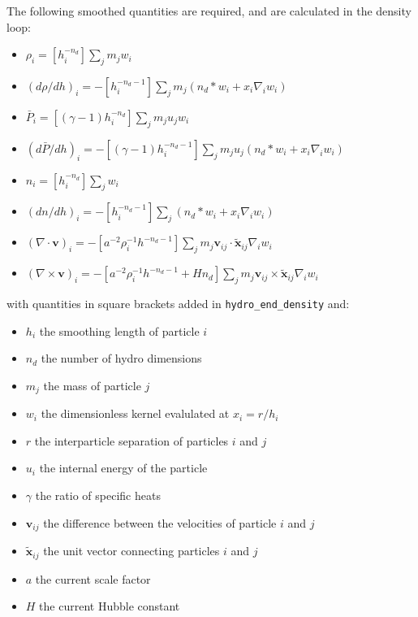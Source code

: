 The following smoothed quantities are required, and are calculated in the density loop:
\begin{itemize}
	\item $\rho_i = [h_i^{-n_d}]\sum_j m_j w_{i}$
	\item $(d\rho/dh)_i = - [h_i^{-n_d - 1}]\sum_j m_j ( n_d * w_i + x_i \nabla_i w_i)$
	\item $\bar{P}_i = [(\gamma - 1)h_i^{-n_d}]\sum_j m_j u_j w_{i}$
	\item $(d\bar{P}/dh)_i = - [(\gamma - 1)h_i^{-n_d - 1}]\sum_j m_j u_j ( n_d * w_i + x_i \nabla_i w_i)$
	\item $n_i = [h_i^{-n_d}]\sum_j w_{i}$
	\item $(dn/dh)_i = - [h_i^{-n_d - 1}]\sum_j ( n_d * w_i + x_i \nabla_i w_i)$
	\item $(\nabla \cdot \mathbf{v})_i = - [a^{-2} \rho_i^{-1} h^{-n_d - 1}]\sum_j m_j \mathbf{v}_{ij} \cdot \tilde{\mathbf{x}}_{ij} \nabla_i w_i$
	\item $(\nabla \times \mathbf{v})_i = - [a^{-2} \rho_i^{-1} h^{-n_d - 1} + Hn_d]\sum_j m_j \mathbf{v}_{ij} \times \tilde{\mathbf{x}}_{ij} \nabla_i w_i$
\end{itemize}
with quantities in square brackets added in {\tt hydro\_end\_density} and:
\begin{itemize}
	\item $h_i$ the smoothing length of particle $i$
	\item $n_d$ the number of hydro dimensions
	\item $m_j$ the mass of particle $j$
	\item $w_{i}$ the dimensionless kernel evalulated at $x_i = r / h_i$
	\item $r$ the interparticle separation of particles $i$ and $j$
	\item $u_i$ the internal energy of the particle
	\item $\gamma$ the ratio of specific heats
	\item $\mathbf{v}_{ij}$ the difference between the velocities of particle $i$ and $j$
	\item $\tilde{\mathbf{x}}_{ij}$ the unit vector connecting particles $i$ and $j$
	\item $a$ the current scale factor
	\item $H$ the current Hubble constant
\end{itemize}

